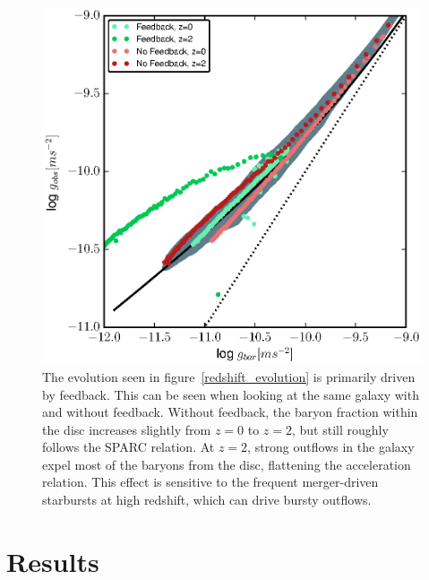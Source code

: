 \begin{figure}
    \includegraphics[width=\textwidth]{figures4/FB_effects.eps}
    \caption[Feedback effects on acceleration relation]{The evolution seen in
    figure~\ref{redshift_evolution} is primarily driven by feedback.  This can
    be seen when looking at the same galaxy with and without feedback.  Without
    feedback, the baryon fraction within the disc increases slightly from $z=0$
    to $z=2$, but still roughly follows the SPARC relation.  At $z=2$, strong
    outflows in the galaxy expel most of the baryons from the disc, flattening
    the acceleration relation.  This effect is sensitive to the frequent
    merger-driven starbursts at high redshift, which can drive bursty outflows.}
    \label{FB_effects}
\end{figure}
\section{Results}
